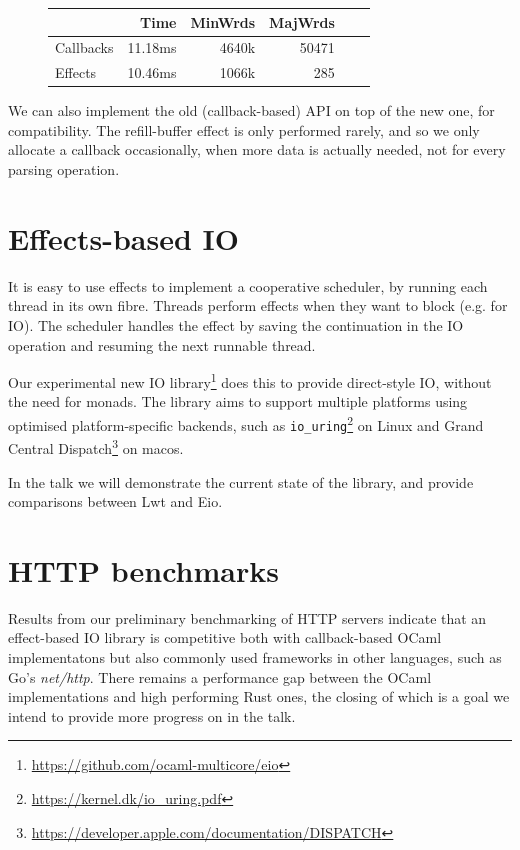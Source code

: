 \documentclass[a4paper,twocolumn]{article}
\begin{document}
\begin{figure}[h]
\begin{tabular}{l|rrrrr}
          & Time     & MinWrds &  MajWrds \\
\hline
Callbacks & 11.18ms  & 4640k   &    50471 \\
Effects   & 10.46ms  & 1066k   &      285 \\
\end{tabular}
\end{figure}

We can also implement the old (callback-based) API on top of the new one, for compatibility.
The refill-buffer effect is only performed rarely, and so we only allocate a callback occasionally,
when more data is actually needed, not for every parsing operation.


\section*{Effects-based IO}

It is easy to use effects to implement a cooperative scheduler,
by running each thread in its own fibre.
Threads perform effects when they want to block (e.g. for IO).
The scheduler handles the effect by saving the continuation in the IO operation and resuming the next runnable thread.

Our experimental new IO library\footnote{\url{https://github.com/ocaml-multicore/eio}}
does this to provide direct-style IO, without the need for monads.
The library aims to support multiple platforms using optimised platform-specific backends,
such as {\tt io\_uring}\footnote{\url{https://kernel.dk/io_uring.pdf}} on Linux and
Grand Central Dispatch\footnote{\url{https://developer.apple.com/documentation/DISPATCH}} on macos.

In the talk we will demonstrate the current state of the library, and provide comparisons between Lwt and Eio.

\section*{HTTP benchmarks}

Results from our preliminary benchmarking of HTTP servers indicate that an effect-based IO library is competitive both with callback-based OCaml implementatons but also commonly used frameworks in other languages, such as Go's \emph{net/http}. There remains a performance gap between the OCaml implementations and high performing Rust ones, the closing of which is a goal we intend to provide more progress on in the talk.
\end{document}
